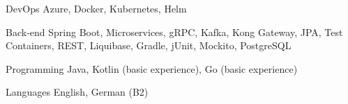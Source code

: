 

\begin{cvskills}

  \cvskill
    {DevOps} %
    {Azure, Docker, Kubernetes, Helm} %

  \cvskill
    {Back-end} %
    {Spring Boot, Microservices, gRPC, Kafka, Kong Gateway, JPA, Test Containers, REST, Liquibase, Gradle, jUnit, Mockito, PostgreSQL} %

  \cvskill
    {Programming} %
    {Java, Kotlin (basic experience), Go (basic experience)} %

  \cvskill
    {Languages} %
    {English, German (B2)} %

\end{cvskills}
